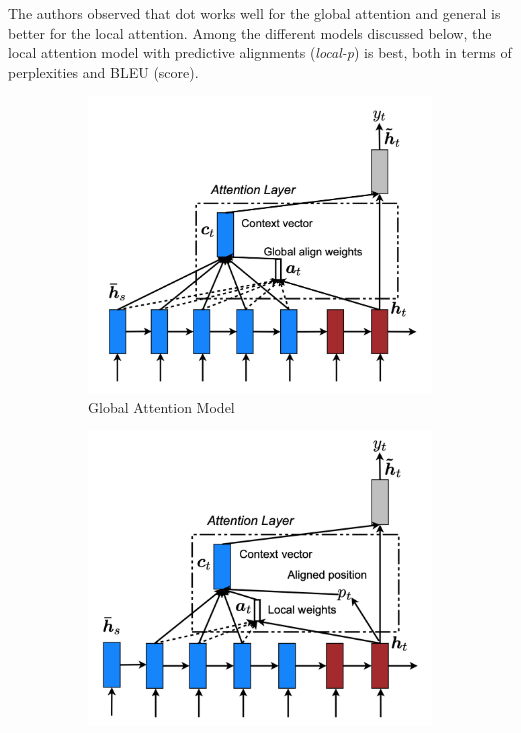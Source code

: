 \documentclass{article}
\begin{document}
	The authors observed that dot works well for the global attention and general is better for the local attention. Among the different models discussed below, the local attention model with predictive alignments (\textit{local-p}) is best, both in terms of perplexities and BLEU (score).
	
	\begin{figure}
		\centering
		\begin{subfigure}{0.3\textwidth}
			\label{fig:globalatn}
			\centering
			\includegraphics[width=1\textwidth]{fig/globalatn.png}
			\caption{Global Attention Model}
		\end{subfigure}
		\hspace*{\fill} %
		\begin{subfigure}{0.3\textwidth}
			\label{fig:localatn}
			\centering
			\includegraphics[width=1\textwidth]{fig/localatn.png}

\end{subfigure}
\end{figure}
\end{document}
